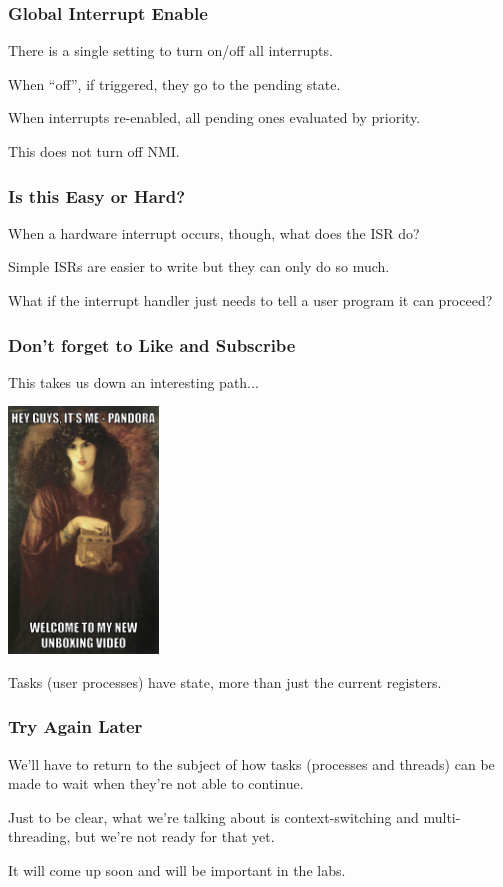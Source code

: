 \begin{frame}
\frametitle{Global Interrupt Enable}

There is a single setting to turn on/off all interrupts.

When ``off'', if triggered, they go to the pending state.

When interrupts re-enabled, all pending ones evaluated by priority.

This does not turn off NMI.

\end{frame}

\begin{frame}
\frametitle{Is this Easy or Hard?}

When a hardware interrupt occurs, though, what does the ISR do?

Simple ISRs are easier to write but they can only do so much.

What if the interrupt handler just needs to tell a user program it can proceed?

\end{frame}

\begin{frame}
\frametitle{Don't forget to Like and Subscribe}

This takes us down an interesting path...

\begin{center}
	\includegraphics[width=0.3\textwidth]{images/pandora.jpg}
\end{center}

Tasks (user processes) have state, more than just the current registers.

\end{frame}

\begin{frame}
\frametitle{Try Again Later}

We'll have to return to the subject of how tasks (processes and threads) can be made to wait when they're not able to continue.

Just to be clear, what we're talking about is context-switching and multi-threading, but we're not ready for that yet.

It will come up soon and will be important in the labs.

\end{frame}

